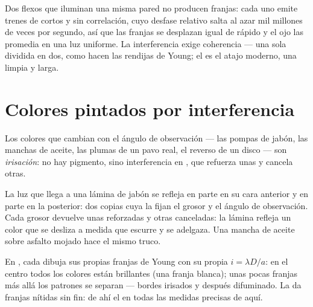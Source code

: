 \begin{remark}\label{rem:g12:light-as-wave:lamps}
Dos flexos que iluminan una misma pared no producen franjas: cada uno
emite trenes de  cortos y sin correlación, cuyo desfase relativo
salta al azar mil millones de veces por segundo, así que las franjas se
desplazan igual de rápido y el ojo las promedia en una luz uniforme. La
interferencia exige coherencia --- una sola  dividida en dos, como
hacen las rendijas de Young; el  es el atajo moderno, una 
limpia y larga.
\end{remark}

\section{Colores pintados por interferencia}

\begin{definition}[Irisación]\label{def:g12:light-as-wave:iridescence}
Los colores que cambian con el ángulo de observación --- las pompas de
jabón, las manchas de aceite, las plumas de un pavo real, el reverso de
un disco --- son \emph{irisación}: no hay pigmento,
sino interferencia en , que refuerza unas  y
cancela otras.
\end{definition}

\begin{example}\label{ex:g12:light-as-wave:soap}
La luz que llega a una lámina de jabón se refleja en parte en su cara
anterior y en parte en la posterior: dos copias  cuya
 la fijan el grosor y el ángulo de observación. Cada
grosor devuelve unas  reforzadas y otras canceladas:
la lámina refleja un color que se desliza a medida que escurre y se
adelgaza. Una mancha de aceite sobre asfalto mojado hace el mismo truco.
\end{example}

\begin{remark}\label{rem:g12:light-as-wave:white}
En , cada  dibuja sus propias franjas de Young
con su propia $i = \lambda D/a$: en el centro todos los colores están
brillantes (una franja blanca); unas pocas franjas más allá los patrones
se separan --- bordes irisados y después difuminado. La  da franjas nítidas sin fin: de ahí el  en todas las
medidas precisas de aquí.
\end{remark}

